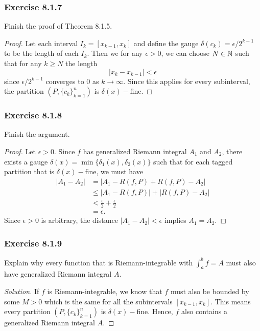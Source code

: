 \subsubsection{Exercise 8.1.7} Finish the proof of Theorem 8.1.5.
\begin{proof}
    Let each interval \( I_{k } = [x_{k-1}, x_{k }] \) and define the gauge \( \delta(c_{k }) =   \epsilon / 2^{k-1}  \) to be the length of each \( I_{k } \). Then we for any \( \epsilon > 0  \), we can choose \( N \in \mathbb{N}  \) such that for any \(  k \geq N  \) the length 
    \[  | x_{k} - x_{k-1}  | < \epsilon \] since \( \epsilon / 2^{k-1}  \) converges to \( 0  \) as \( k \to \infty  \). Since this applies for every subinterval, the partition \( (P, \{ c_{k }  \}_{k=1}^{n}) \) is \( \delta(x)- \)fine.


\end{proof}


\subsubsection{Exercise 8.1.8} Finish the argument.
\begin{proof}
Let \( \epsilon > 0  \). Since \( f  \) has generalized Riemann integral \( A_{1} \) and \( A_{2} \), there exists a gauge \( \delta(x) = \min \{ \delta_1(x), \delta_2(x)  \}  \) such that for each tagged partition that is \( \delta(x)- \)fine, we must have
\begin{align*}
    | A_{1} - A_{2} | &= \Big| A_{1} - R(f,P) + R(f,P) - A_{2} \Big|   \\
                      &\leq | A_{1} - R(f,P)  | + | R(f,P) - A_{2} | \\
                      &< \frac{ \epsilon  }{ 2 }  + \frac{ \epsilon  }{ 2 } \\
                      &= \epsilon.
\end{align*}
Since \( \epsilon > 0  \) is arbitrary, the distance \( | A_{1} - A_{2}  | < \epsilon \) implies \( A_{1} = A_{2} \).
\end{proof}

\subsubsection{Exercise 8.1.9} Explain why every function that is Riemann-integrable with \( \int_{ a }^{ b } f = A  \) must also have generalized Riemann integral \( A  \).
\begin{proof}[Solution]
    If \( f \) is Riemann-integrable, we know that \( f  \) must also be bounded by some \( M > 0  \) which is the same for all the subintervals \( [ x_{k-1}, x_{k }] \). This means every partition \( (P, \{ c_{k } \}_{k=1}^n) \) is \( \delta(x)- \)fine. Hence, \( f  \) also contains a generalized Riemann integral \( A  \). 
\end{proof}

